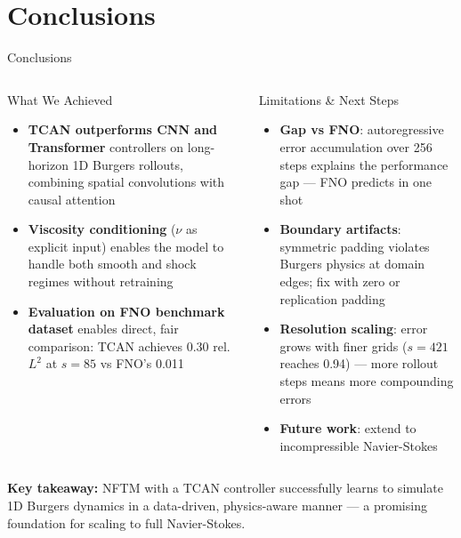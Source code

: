 
\section{Conclusions}
\begin{frame}{Conclusions}

\begin{columns}[T]

\begin{block}{What We Achieved}
\begin{itemize}
    \item \scriptsize \textbf{TCAN outperforms CNN and Transformer} controllers on long-horizon 1D Burgers rollouts, combining spatial convolutions with causal attention
    \item \scriptsize \textbf{Viscosity conditioning} ($\nu$ as explicit input) enables the model to handle both smooth and shock regimes without retraining

    \item \scriptsize \textbf{Evaluation on FNO benchmark dataset} enables direct, fair comparison: TCAN achieves 0.30 rel.\ $L^2$ at $s{=}85$ vs FNO's 0.011
\end{itemize}
\end{block}

\begin{block}{Limitations \& Next Steps}
\begin{itemize}
    \item \scriptsize \textbf{Gap vs FNO}: autoregressive error accumulation over 256 steps explains the performance gap — FNO predicts in one shot
    \item \scriptsize \textbf{Boundary artifacts}: symmetric padding violates Burgers physics at domain edges; fix with zero or replication padding
    \item \scriptsize \textbf{Resolution scaling}: error grows with finer grids ($s{=}421$ reaches 0.94) — more rollout steps means more compounding errors
    \item \scriptsize \textbf{Future work}: extend to incompressible Navier-Stokes
\end{itemize}
\end{block}

\end{columns}

\vspace{0.3em}
\begin{center}
\fontsize{7}{9}\selectfont
\textcolor{red_unipd}{\textbf{Key takeaway:}} NFTM with a TCAN controller successfully learns to simulate 1D Burgers dynamics in a data-driven, physics-aware manner — a promising foundation for scaling to full Navier-Stokes.
\end{center}

\end{frame}